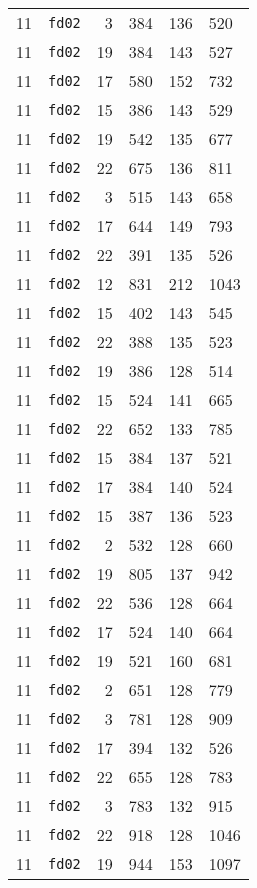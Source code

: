 \documentclass{article}
\begin{document}
\begin{table}[h!]
\begin{tabular}{llrrrl}
    11 & \texttt{fd02} & 3 & 384 & 136 & 520 \\
    11 & \texttt{fd02} & 19 & 384 & 143 & 527 \\
    11 & \texttt{fd02} & 17 & 580 & 152 & 732 \\
    11 & \texttt{fd02} & 15 & 386 & 143 & 529 \\
    11 & \texttt{fd02} & 19 & 542 & 135 & 677 \\
    11 & \texttt{fd02} & 22 & 675 & 136 & 811 \\
    11 & \texttt{fd02} & 3 & 515 & 143 & 658 \\
    11 & \texttt{fd02} & 17 & 644 & 149 & 793 \\
    11 & \texttt{fd02} & 22 & 391 & 135 & 526 \\
    11 & \texttt{fd02} & 12 & 831 & 212 & 1043 \\
    11 & \texttt{fd02} & 15 & 402 & 143 & 545 \\
    11 & \texttt{fd02} & 22 & 388 & 135 & 523 \\
    11 & \texttt{fd02} & 19 & 386 & 128 & 514 \\
    11 & \texttt{fd02} & 15 & 524 & 141 & 665 \\
    11 & \texttt{fd02} & 22 & 652 & 133 & 785 \\
    11 & \texttt{fd02} & 15 & 384 & 137 & 521 \\
    11 & \texttt{fd02} & 17 & 384 & 140 & 524 \\
    11 & \texttt{fd02} & 15 & 387 & 136 & 523 \\
    11 & \texttt{fd02} & 2 & 532 & 128 & 660 \\
    11 & \texttt{fd02} & 19 & 805 & 137 & 942 \\
    11 & \texttt{fd02} & 22 & 536 & 128 & 664 \\
    11 & \texttt{fd02} & 17 & 524 & 140 & 664 \\
    11 & \texttt{fd02} & 19 & 521 & 160 & 681 \\
    11 & \texttt{fd02} & 2 & 651 & 128 & 779 \\
    11 & \texttt{fd02} & 3 & 781 & 128 & 909 \\
    11 & \texttt{fd02} & 17 & 394 & 132 & 526 \\
    11 & \texttt{fd02} & 22 & 655 & 128 & 783 \\
    11 & \texttt{fd02} & 3 & 783 & 132 & 915 \\
    11 & \texttt{fd02} & 22 & 918 & 128 & 1046 \\
    11 & \texttt{fd02} & 19 & 944 & 153 & 1097 \\

\end{tabular}
\end{table}
\end{document}
